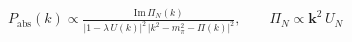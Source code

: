 \documentclass[border=2pt]{standalone}
\begin{document}
$\displaystyle P_{\mathrm{abs}}(k)\propto\frac{\mathrm{Im}\,\Pi_N(k)}{\big|1-\lambda\,U(k)\big|^2\,\big|k^2-m_\pi^2-\Pi(k)\big|^2},\qquad \Pi_N\propto\mathbf k^2\,U_N$
\end{document}
